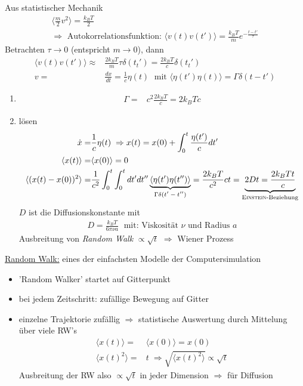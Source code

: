 \documentclass[12pt]{article}
\begin{document}
Aus statistischer Mechanik
\begin{align}
\langle \frac{m}{2} v^2 \rangle = \frac{k_B T}{2} \\
\Rightarrow \mbox{ Autokorrelationsfunktion: } 
\langle v(t) v(t') \rangle = \frac{k_B T}{m} e^{- \frac{t-t'}{\tau}}
\end{align}
Betrachten $\tau \to 0$ (entspricht $ m\to 0$), dann
\begin{align}
\langle v(t) v(t') \rangle \approx & \frac{2 k_B T}{m} \tau \delta (t_t') =\frac{2 k_B T}{c} \delta (t_t') \\
v=& \frac{dx}{dt}= \frac{1}{c} \eta (t) \; \mbox{ mit } \langle \eta (t') \eta (t) \rangle = \Gamma \delta (t-t') 
\end{align}
\begin{enumerate} 
\item
\begin{align}
\Gamma =& c^2 \frac{2 k_B T}{c} = 2 k_B T c
\end{align}
\item lösen \begin{align}
\dot{x}= & \frac{1}{c} \eta (t) \; \Rightarrow x(t) = x(0) + \int_0^t \frac{\eta (t')}{c} dt' \\
\langle x(t) \rangle =& \langle x(0) \rangle = 0 \\
\langle (x(t) - x(0))^2 \rangle =& \frac{1}{c^2} \int_0^t \int_0^t dt' dt'' \underbrace{\langle \eta (t') \eta (t'') \rangle}_\text{$ \Gamma \delta (t' - t'')$} = \frac{2 k_B T}{c^2} c t = \underbrace{2 D t = \frac{2 k_B T t}{c}}_\text{\textsc{Einstein}-Beziehung}
\end{align}
$D$ ist die Diffusionskonstante mit \begin{align}
D= \frac{k_B T}{6 \pi \nu a} \; \mbox{ mit: Viskosität } \nu \mbox{ und Radius } a
\end{align}
Ausbreitung von \textit{Random Walk} $\propto \sqrt{t}$ $\Rightarrow$ Wiener Prozess
\end{enumerate}
\underline{Random Walk:} eines der einfachsten Modelle der Computersimulation
\begin{itemize}
\item 'Random Walker' startet auf Gitterpunkt
\item bei jedem Zeitschritt: zufällige Bewegung auf Gitter
\item einzelne Trajektorie zufällig $\Rightarrow$ statistische Auswertung durch Mittelung über viele RW's
\begin{align*}
\langle x(t) \rangle =& \langle x(0) \rangle = x(0) \\
\langle x(t)^2 \rangle = & t \; \Rightarrow \sqrt{\langle x(t)^2 \rangle} \propto \sqrt{t}
\end{align*}
Ausbreitung der RW also $\propto \sqrt{t}$ in jeder Dimension $\Rightarrow$ für Diffusion
\end{itemize}
\end{document}
